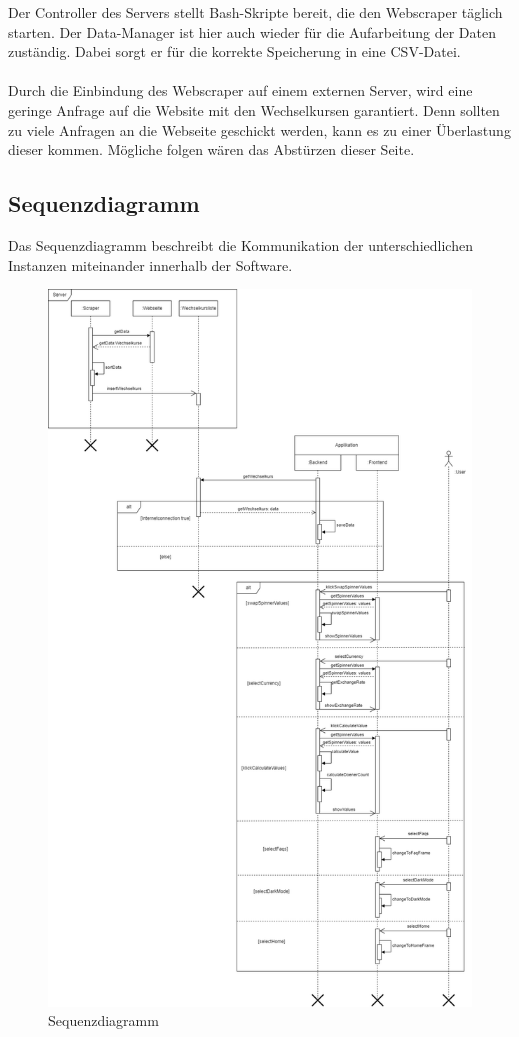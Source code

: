 \documentclass[conference]{IEEEtran}
\begin{document}
 Der Controller des Servers stellt Bash-Skripte bereit, die den Webscraper täglich starten. Der Data-Manager ist hier auch wieder für die Aufarbeitung der Daten zuständig. Dabei sorgt er für die korrekte Speicherung in eine CSV-Datei.\\\\
Durch die Einbindung des Webscraper auf einem externen Server, wird eine geringe Anfrage auf die Website mit den Wechselkursen garantiert. Denn sollten zu viele Anfragen an die Webseite geschickt werden, kann es zu einer Überlastung dieser kommen. Mögliche folgen wären das Abstürzen dieser Seite.

\subsection{Sequenzdiagramm}
Das Sequenzdiagramm beschreibt die Kommunikation der unterschiedlichen Instanzen miteinander innerhalb der Software. 

\begin{figure}[h]
	\centering
	\includegraphics[width=1\linewidth, frame]{Sequenzdiagramm.drawio}
	\caption[Sequenzdiagramm]{Sequenzdiagramm}
	\label{fig:sequenzdiagramm}
\end{figure}
\end{document}
